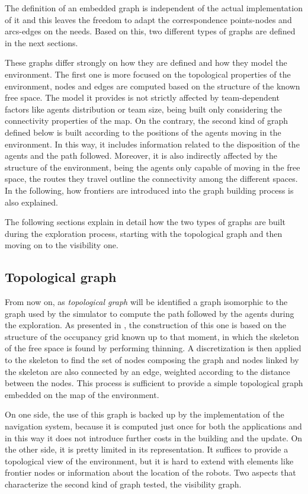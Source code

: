 The definition of an embedded graph is independent of the actual implementation
of it and this leaves the freedom to adapt the correspondence points-nodes
and arcs-edges on the needs. Based on this, two different types of
graphs are defined in the next sections. 

These graphs differ strongly on how they are defined and how they
model the environment. The first one is more focused on the topological
properties of the environment, nodes and edges are computed based
on the structure of the known free space. The model it provides is
not strictly affected by team-dependent factors like agents distribution
or team size, being built only considering the connectivity properties
of the map. On the contrary, the second kind of graph defined below
is built according to the positions of the agents moving in the environment.
In this way, it includes information related to the disposition of
the agents and the path followed. Moreover, it is also indirectly
affected by the structure of the environment, being the agents only
capable of moving in the free space, the routes they travel outline
the connectivity among the different spaces. In the following, how
frontiers are introduced into the graph building process is also explained. 

The following sections explain in detail how the two types of graphs
are built during the exploration process, starting with the topological
graph and then moving on to the visibility one. 

\subsection{Topological graph}

From now on, as \emph{topological graph} will be identified a graph
isomorphic to the graph used by the simulator to compute the path
followed by the agents during the exploration. As presented in \cite{Spirin2015},
the construction of this one is based on the structure of the occupancy
grid known up to that moment, in which the skeleton of the free space
is found by performing thinning. A discretization is then applied
to the skeleton to find the set of nodes composing the graph and nodes
linked by the skeleton are also connected by an edge, weighted according
to the distance between the nodes. This process is sufficient to provide
a simple topological graph embedded on the map of the environment. 

On one side, the use of this graph is backed up by the implementation
of the navigation system, because it is computed just once for both
the applications and in this way it does not introduce further costs
in the building and the update. On the other side, it is pretty limited
in its representation. It suffices to provide a topological view of
the environment, but it is hard to extend with elements like frontier
nodes or information about the location of the robots. Two aspects
that characterize the second kind of graph tested, the visibility
graph. 

